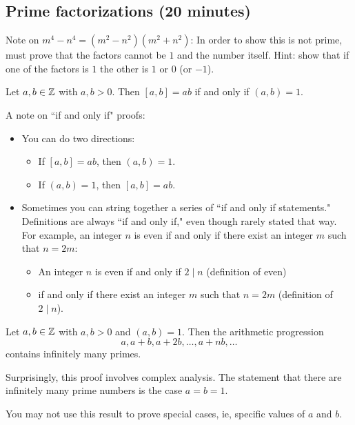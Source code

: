 \documentclass[letterpaper, 11 pt]{ximera}
\begin{document}

\subsection{Prime factorizations (20 minutes)}
Note on $m^4-n^4=(m^2-n^2)(m^2+n^2)$: In order to show this is not prime, must prove that the factors cannot be $1$ and the number itself. Hint: show that if one of the factors is $1$ the other is $1$ or $0$ (or $-1$).


\begin{cor}[Corollary 1.20]
 Let $a,b\in\mathbb Z$ with $a,b>0$. Then $[a,b]=ab$ if and only if $(a,b)=1$.
\end{cor}
A note on ``if and only if" proofs: 
\begin{itemize}
 \item You can do two directions: 
\begin{itemize}
 \item  If $[a,b]=ab$, then $(a,b)=1$.
 \item  If $(a,b)=1$, then $[a,b]=ab$.
\end{itemize}
\item Sometimes you can string together a series of ``if and only if statements." Definitions are always ``if and only if," even though rarely stated that way. For example, an integer $n$ is even if and only if there exist an integer $m$ such that $n=2m$:
\begin{itemize}
 \item An integer $n$ is even if and only if $2\mid n$ (definition of even) 
 \item if and only if there exist an integer $m$ such that $n=2m$ (definition of $2\mid n$).
\end{itemize}
\end{itemize}

\begin{thm}
 Let $a,b\in\mathbb Z$ with $a,b>0$ and $(a,b)=1$. Then the arithmetic progression \[a,a+b, a+2b, \dots, a+nb,\dots\]
 contains infinitely many primes.
\end{thm}
Surprisingly, this proof involves complex analysis. The statement that there are infinitely many prime numbers is the case $a=b=1$.


\begin{warning}
    You may not use this result to prove special cases, ie, specific values of $a$ and $b$.
\end{warning}
\end{document}
